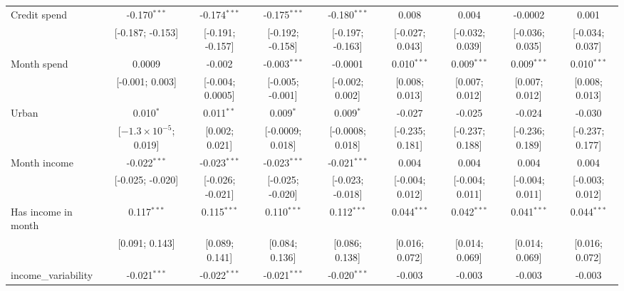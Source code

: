\begin{table}[htbp]
\begin{threeparttable}[b]
\begin{tabular}{lcccccccc}
         Credit spend             & -0.170$^{***}$                 & -0.174$^{***}$   & -0.175$^{***}$   & -0.180$^{***}$   & 0.008           & 0.004           & -0.0002         & 0.001\\   
                                  & [-0.187; -0.153]               & [-0.191; -0.157] & [-0.192; -0.158] & [-0.197; -0.163] & [-0.027; 0.043] & [-0.032; 0.039] & [-0.036; 0.035] & [-0.034; 0.037]\\   
         Month spend              & 0.0009                         & -0.002           & -0.003$^{***}$   & -0.0001          & 0.010$^{***}$   & 0.009$^{***}$   & 0.009$^{***}$   & 0.010$^{***}$\\   
                                  & [-0.001; 0.003]                & [-0.004; 0.0005] & [-0.005; -0.001] & [-0.002; 0.002]  & [0.008; 0.013]  & [0.007; 0.012]  & [0.007; 0.012]  & [0.008; 0.013]\\   
         Urban                    & 0.010$^{*}$                    & 0.011$^{**}$     & 0.009$^{*}$      & 0.009$^{*}$      & -0.027          & -0.025          & -0.024          & -0.030\\   
                                  & [$-1.3\times 10^{-5}$; 0.019]  & [0.002; 0.021]   & [-0.0009; 0.018] & [-0.0008; 0.018] & [-0.235; 0.181] & [-0.237; 0.188] & [-0.236; 0.189] & [-0.237; 0.177]\\   
         Month income             & -0.022$^{***}$                 & -0.023$^{***}$   & -0.023$^{***}$   & -0.021$^{***}$   & 0.004           & 0.004           & 0.004           & 0.004\\   
                                  & [-0.025; -0.020]               & [-0.026; -0.021] & [-0.025; -0.020] & [-0.023; -0.018] & [-0.004; 0.012] & [-0.004; 0.011] & [-0.004; 0.011] & [-0.003; 0.012]\\   
         Has income in month      & 0.117$^{***}$                  & 0.115$^{***}$    & 0.110$^{***}$    & 0.112$^{***}$    & 0.044$^{***}$   & 0.042$^{***}$   & 0.041$^{***}$   & 0.044$^{***}$\\   
                                  & [0.091; 0.143]                 & [0.089; 0.141]   & [0.084; 0.136]   & [0.086; 0.138]   & [0.016; 0.072]  & [0.014; 0.069]  & [0.014; 0.069]  & [0.016; 0.072]\\   
         income\_variability      & -0.021$^{***}$                 & -0.022$^{***}$   & -0.021$^{***}$   & -0.020$^{***}$   & -0.003          & -0.003          & -0.003          & -0.003\\   

\end{tabular}
\end{threeparttable}
\end{table}
